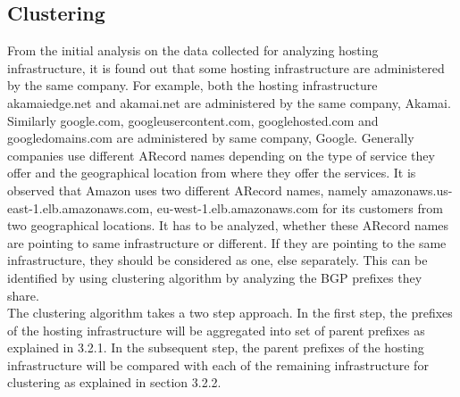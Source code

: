\subsection{Clustering}
\noindent From the initial analysis on the data collected for analyzing hosting infrastructure, it is found out that some hosting infrastructure are administered by the same company. For example, both the hosting infrastructure akamaiedge.net and akamai.net are administered by the same company, Akamai. Similarly google.com, googleusercontent.com, googlehosted.com and googledomains.com are administered by same company, Google. Generally companies use different ARecord names depending on the type of service they offer and the geographical location from where they offer the services. It is observed that Amazon uses two different ARecord names, namely amazonaws.us-east-1.elb.amazonaws.com, eu-west-1.elb.amazonaws.com for its customers from two geographical locations. It has to be analyzed, whether these ARecord names are pointing to same infrastructure or different. If they are pointing to the same infrastructure, they should be considered as one, else separately. This can be identified by using clustering algorithm by analyzing the BGP prefixes they share. \\

\noindent The clustering algorithm takes a two step approach. In the first step, the prefixes of the hosting infrastructure will be aggregated into set of parent prefixes as explained in 3.2.1. In the subsequent step, the parent prefixes of the hosting infrastructure will be compared with each of the remaining infrastructure for clustering as explained in section 3.2.2.\\
